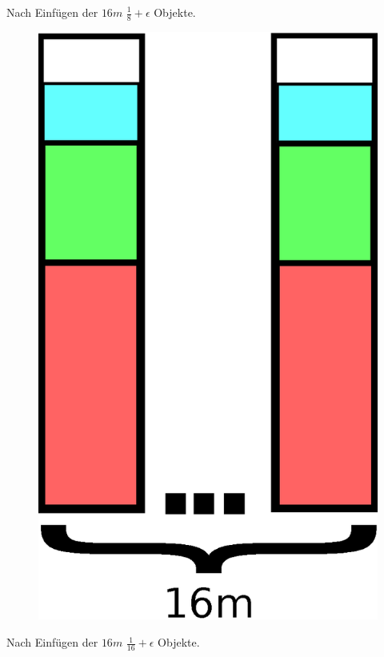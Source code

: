 \documentclass{article}
\begin{document}
\begin{multicols}{2}
Nach Einfügen der $16m$ $\frac{1}{8}+\epsilon$ Objekte. 
\begin{figure}[H]
\begin{center}
	\includegraphics[scale=.3]{third}
\end{center}
\end{figure}
\columnbreak%
Nach Einfügen der $16m$ $\frac{1}{16}+\epsilon$ Objekte. 
\begin{figure}[H]
\begin{center}

\end{center}
\end{figure}
\end{multicols}
\end{document}
